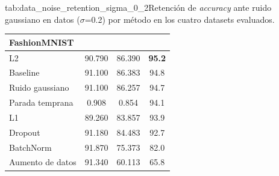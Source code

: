 \begin{table}{tab:data_noise_retention_sigma_0_2}{Retención de \textit{accuracy} ante ruido gaussiano en datos ($\sigma$=0.2) por método en los cuatro datasets evaluados.}
\begin{tabular}{lccc}
\midrule
\multicolumn{4}{l}{\textbf{FashionMNIST}}\\
\midrule
L2 & 90.790 & 86.390 & \textbf{95.2} \\
Baseline & 91.100 & 86.383 & 94.8 \\
Ruido gaussiano & 91.100 & 86.257 & 94.7 \\
Parada temprana & 0.908 & 0.854 & 94.1 \\
L1 & 89.260 & 83.857 & 93.9 \\
Dropout & 91.180 & 84.483 & 92.7 \\
BatchNorm & 91.870 & 75.373 & 82.0 \\
Aumento de datos & 91.340 & 60.113 & 65.8 \\
\bottomrule
\end{tabular}
\end{table}
